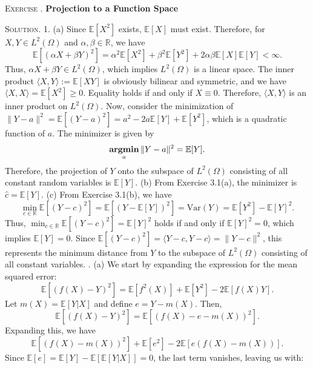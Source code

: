 \documentclass[12pt, a4paper, oneside]{ctexart}
\newcounter{exercisename}
\newenvironment{exercise}{\stepcounter{exercisename}\par\noindent\textsc{Exercise \arabic{exercisename}. }}{\\\par}
\newenvironment{solution}{\par\noindent\textsc{Solution. }}{\\\par}
\DeclareMathOperator*{\argmin}{\bf argmin}
\begin{document}
\begin{exercise}
	\bf Projection to a Function Space
\end{exercise}

\begin{solution}
	1. (a) Since $\mathbb{E}[X^2]$ exists, $\mathbb{E}[X]$ must exist. Therefore, for $X, Y \in L^2(\Omega)$ and $\alpha, \beta \in \mathbb{R}$, we have
	\[
	\mathbb{E}[(\alpha X + \beta Y)^{2}] = \alpha^{2} \mathbb{E}[X^{2}] + \beta^{2} \mathbb{E}[Y^{2}] + 2\alpha\beta \mathbb{E}[X]\mathbb{E}[Y] < \infty.
	\]
	Thus, $\alpha X + \beta Y \in L^2(\Omega)$, which implies $L^2(\Omega)$ is a linear space. The inner product $\langle X, Y \rangle := \mathbb{E}[XY]$ is obviously bilinear and symmetric, and we have $\langle X, X \rangle = \mathbb{E}[X^2] \geq 0$. Equality holds if and only if $X \equiv 0$. Therefore, $\langle X, Y \rangle$ is an inner product on $L^2(\Omega)$.
	Now, consider the minimization of $\|Y - a\|^2 = \mathbb{E}[(Y - a)^2] = a^2 - 2a\mathbb{E}[Y] + \mathbb{E}[Y^2]$, which is a quadratic function of $a$. The minimizer is given by
	\[
	\argmin_a \|Y - a\|^2 = \mathbb{E}[Y].
	\]
	Therefore, the projection of $Y$ onto the subspace of $L^2(\Omega)$ consisting of all constant random variables is $\mathbb{E}[Y]$.
	\newline\newline
	(b) From Exercise 3.1(a), the minimizer is $\hat{c} = \mathbb{E}[Y]$.
	\newline\newline
	(c) From Exercise 3.1(b), we have
	\[
	\min_{c \in \mathbb{R}} \mathbb{E}[(Y - c)^2] = \mathbb{E}[(Y - \mathbb{E}[Y])^2] = \text{Var}(Y) = \mathbb{E}[Y^2] - \mathbb{E}[Y]^2.
	\]
	Thus, $\min_{c \in \mathbb{R}} \mathbb{E}[(Y - c)^2] = \mathbb{E}[Y]^2$ holds if and only if $\mathbb{E}[Y]^2 = 0$, which implies $\mathbb{E}[Y] = 0$. Since $\mathbb{E}[(Y - c)^2] = \langle Y - c, Y - c \rangle = \|Y - c\|^2$, this represents the minimum distance from $Y$ to the subspace of $L^2(\Omega)$ consisting of all constant variables.
	\newline{}. (a) We start by expanding the expression for the mean squared error:
	\[
	\mathbb{E}[(f(X) - Y)^2] = \mathbb{E}[f^2(X)] + \mathbb{E}[Y^2] - 2\mathbb{E}[f(X)Y].
	\]
	Let $m(X) = \mathbb{E}[Y|X]$ and define $e = Y - m(X)$. Then,
	\[
	\mathbb{E}[(f(X) - Y)^2] = \mathbb{E}[(f(X) - e - m(X))^2].
	\]
	Expanding this, we have
	\[
	\mathbb{E}[(f(X) - m(X))^2] + \mathbb{E}[e^2] - 2\mathbb{E}[e(f(X) - m(X))].
	\]
	Since $\mathbb{E}[e] = \mathbb{E}[Y] - \mathbb{E}[\mathbb{E}[Y|X]] = 0$, the last term vanishes, leaving us with:

\end{solution}
\end{document}
